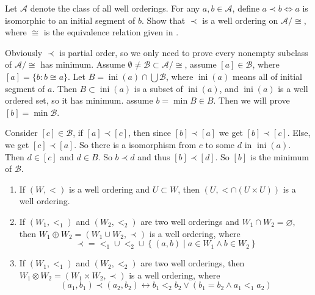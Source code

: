 \documentclass{ctexart}
\newcommand{\ini}{\mathrm{\mathop{ini}}}
\begin{document}
\begin{problem}
 Let $\mathcal{A}$ denote the class of all well orderings. For any $a,b\in\mathcal{A}$, define $a\prec b\iff a$ is isomorphic to an initial segment of $b$. Show that $\prec$ is a well ordering on $\mathcal{A}/\cong$, where $\cong$ is the equivalence relation given in .  
\end{problem}

\begin{solution}
 Obviously $\prec$ is partial order, so we only need to prove every nonempty subclass of $\mathcal{A}/\cong $ has minimum. 
 Assume $\emptyset\neq\mathcal{B}\subset \mathcal{A}/\cong$, assume $[a]\in \mathcal{B}$, where $[a]=\{b:b\cong a\}$. Let $B=\ini(a)\cap \bigcup\mathcal{B}$, where $\ini(a)$ means all of initial segment of $a$. Then $B\subset \ini(a)$ is a subset of $\ini(a)$, and $\ini(a)$ is a well ordered set, so it has minimum. assume $b=\min B\in B$. Then we will prove $[b]=\min \mathcal{B}$. 

 Consider $[c]\in \mathcal{B}$, if $[a]\prec [c]$, then since $[b]\prec [a]$ we get $[b]\prec [c]$. Else, we get $[c]\prec[a]$. So there is a isomorphism from $c$ to some $d$ in $\ini(a)$. Then $d\in[c]$ and $d\in B$. So $b\prec d$ and thus $[b]\prec [d]$. So $[b]$ is the minimum of $\mathcal{B}$. 
\end{solution}

\begin{problem}
 \begin{enumerate}
  \item If $(W,<)$ is a well ordering and $U \subset W$, then $(U,<\cap(U \times U))$ is a well ordering.
  \item 
  If $\left(W_1,<_1\right)$ and $\left(W_2,<_2\right)$ are two well orderings and $W_1 \cap W_2=\varnothing$, then $W_1 \oplus W_2=\left(W_1 \cup W_2, \prec\right)$ is a well ordering, where
  $$
  \prec=<_1 \cup<_2 \cup\left\{(a, b) \mid a \in W_1 \wedge b \in W_2\right\}
  $$
  \item
  If $\left(W_1,<_1\right)$ and $\left(W_2,<_2\right)$ are two well orderings, then $W_1 \otimes W_2=\left(W_1 \times W_2, \prec\right)$ is a well ordering, where
  $$
  \left(a_1, b_1\right) \prec\left(a_2, b_2\right) \leftrightarrow b_1<_2 b_2 \vee\left(b_1=b_2 \wedge a_1<_1 a_2\right)
  $$
 \end{enumerate}
\end{problem}
\end{document}
